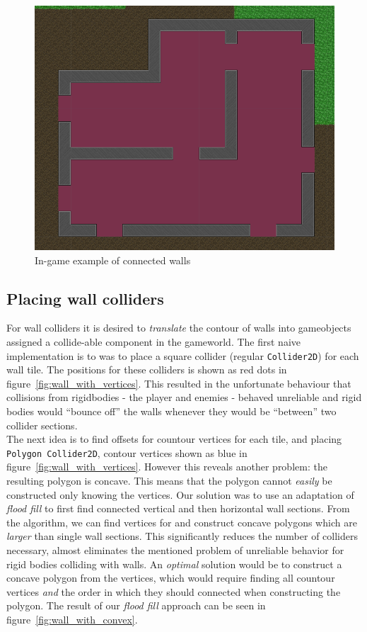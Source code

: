 \begin{figure}[H]
    \centering
    \includegraphics[width=1\textwidth]{figures/generating_levels/walls_ingame.png}
    \caption{In-game example of connected walls}\label{fig:walls_ingame} 
\end{figure}

\subsection{Placing wall colliders}
For wall colliders it is desired to \textit{translate} the contour of walls into
gameobjects assigned a collide-able component in the gameworld. The first naive
implementation is to was to place a square collider (regular
\texttt{Collider2D}) for each wall tile.
The positions for these colliders is shown as red dots in
figure~\ref{fig:wall_with_vertices}.
This resulted in the unfortunate behaviour that collisions from rigidbodies -
the player and enemies - behaved unreliable and rigid bodies would ``bounce off''
the walls whenever they would be ``between'' two collider sections.
\\
The next idea is to find offsets for countour vertices for each tile, and
placing \texttt{Polygon Collider2D}, contour vertices shown as blue in
figure~\ref{fig:wall_with_vertices}. However this reveals another problem: the resulting
polygon is concave. This means that the polygon cannot
\textit{easily} be constructed only knowing the vertices. Our
solution was to use an adaptation of \textit{flood fill} to first find
connected vertical and then horizontal wall sections. From the algorithm, we
can find vertices for and construct concave polygons which are \textit{larger}
than single wall sections. This significantly reduces the number of colliders
necessary, almost eliminates the mentioned problem of unreliable behavior for
rigid bodies colliding with walls. An \textit{optimal} solution would be to
construct a concave polygon from the vertices, which would require finding all
countour vertices \textit{and} the order in which they should connected when
constructing the polygon. The result of our \textit{flood fill} approach can be
seen in figure~\ref{fig:wall_with_convex}.

